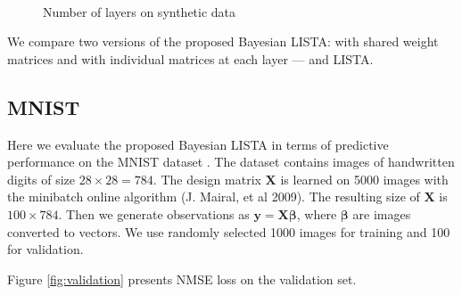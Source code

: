 \documentclass[letterpaper]{article}
\begin{document}
\begin{figure}[t]
~
\caption{Number of layers on synthetic data}
\label{fig:number_of_layers_synthetic}
\end{figure}

We compare two versions of the proposed Bayesian LISTA: with shared weight matrices and with individual matrices at each layer --- and LISTA.


\subsection{MNIST}
Here we evaluate the proposed Bayesian LISTA in terms of predictive performance on the MNIST dataset \cite{lecun2010mnist}. The dataset contains images of handwritten digits of size $28 \times 28 = 784$. The design matrix $\mathbf{X}$ is learned on 5000 images with the minibatch online algorithm (J. Mairal, et al 2009). The resulting size of $\mathbf{X}$ is $100 \times 784$. Then we generate observations as $\mathbf{y} = \mathbf{X}\boldsymbol\beta$, where $\boldsymbol\beta$ are images converted to vectors. We use randomly selected 1000 images for training and 100 for validation. 

Figure \ref{fig:validation} presents NMSE loss on the validation set. 
\end{document}
